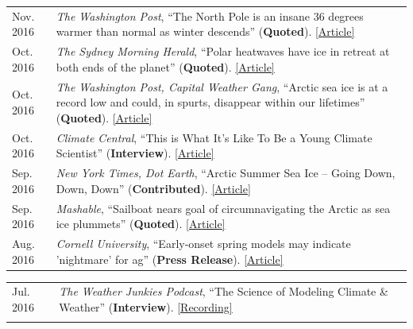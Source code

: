 \documentclass[margin,line,palatino,courier,10pt]{res}
\begin{document}
\begin{resume}
\begin{tabular}{@{}p{0.9in}p{4in}}
Nov. 2016 & \textit{The Washington Post}, ``The North Pole is an insane 36 degrees warmer than normal as winter descends'' (\textbf{Quoted}). \href{https://www.washingtonpost.com/news/energy-environment/wp/2016/11/17/the-north-pole-is-an-insane-36-degrees-warmer-than-normal-as-winter-descends/?utm_term=.f2cb9596b3d8}{[Article]}\\
Oct. 2016 & \textit{The Sydney Morning Herald}, ``Polar heatwaves have ice in retreat at both ends of the planet'' (\textbf{Quoted}). \href{http://www.smh.com.au/environment/climate-change/polar-heatwaves-have-ice-in-retreat-at-both-ends-of-the-planet-20161030-gse9q6.html}{[Article]}\\
Oct. 2016 & \textit{The Washington Post, Capital Weather Gang}, ``Arctic sea ice is at a record low and could, in spurts, disappear within our lifetimes'' (\textbf{Quoted}). \href{https://www.washingtonpost.com/news/capital-weather-gang/wp/2016/10/27/arctic-sea-ice-is-at-a-record-low-and-could-in-spurts-disappear-within-our-lifetimes/}{[Article]}\\
Oct. 2016 & \textit{Climate Central}, ``This is What It's Like To Be a Young Climate Scientist'' (\textbf{Interview}). \href{http://www.climatecentral.org/news/young-climate-scientists-interviews-20799}{[Article]}\\
Sep. 2016 & \textit{New York Times, Dot Earth}, ``Arctic Summer Sea Ice -- Going Down, Down, Down'' (\textbf{Contributed}). \href{http://dotearth.blogs.nytimes.com/2016/09/16/arctic-summer-sea-ice-going-down-down-down/?module=BlogPost-ReadMore&version=Blog\%20Main&action=Click&contentCollection=arctic&pgtype=Blogs&region=Body&_r=1#more-58318}{[Article]}\\
Sep. 2016 & \textit{Mashable}, ``Sailboat nears goal of circumnavigating the Arctic as sea ice plummets'' (\textbf{Quoted}). \href{http://mashable.com/2016/09/01/sailboat-arctic-ice-melt-open-water/#s7nzft8m6sqB}{[Article]}\\
Aug. 2016 & \textit{Cornell University}, ``Early-onset spring models may indicate 'nightmare' for ag'' (\textbf{Press Release}). \href{http://www.news.cornell.edu/stories/2016/08/early-onset-spring-models-may-indicate-nightmare-ag}{[Article]}\\
\end{tabular}
\begin{tabular}{@{}p{0.9in}p{4in}}
Jul. 2016 & \textit{The Weather Junkies Podcast}, ``The Science of Modeling Climate \& Weather'' (\textbf{Interview}). \href{https://www.youtube.com/watch?v=vgT5P9zC91U}{[Recording]}\\\\


\end{tabular}
\end{resume}
\end{document}
